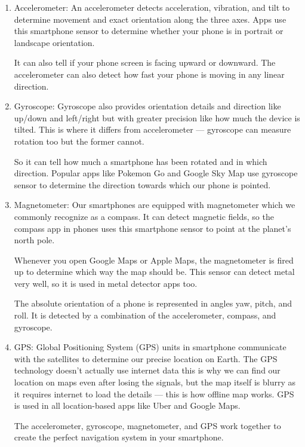 \documentclass[12pt]{article}
\begin{document}
\begin{enumerate}

\item Accelerometer: An accelerometer detects acceleration, vibration, and tilt to determine movement and exact orientation along the three axes. Apps use this smartphone sensor to determine whether your phone is in portrait or landscape orientation.

It can also tell if your phone screen is facing upward or downward. The accelerometer can also detect how fast your phone is moving in any linear direction.

\item Gyroscope: Gyroscope also provides orientation details and direction like up/down and left/right but with greater precision like how much the device is tilted. This is where it differs from accelerometer — gyroscope can measure rotation too but the former cannot.

So it can tell how much a smartphone has been rotated and in which direction. Popular apps like Pokemon Go and Google Sky Map use gyroscope sensor to determine the direction towards which our phone is pointed.

\item Magnetometer: Our smartphones are equipped with magnetometer which we commonly recognize as a compass. It can detect magnetic fields, so the compass app in phones uses this smartphone sensor to point at the planet’s north pole.

Whenever you open Google Maps or Apple Maps, the magnetometer is fired up to determine which way the map should be. This sensor can detect metal very well, so it is used in metal detector apps too.

    The absolute orientation of a phone is represented in angles yaw, pitch, and roll. It is detected by a combination of the accelerometer, compass, and gyroscope.

\item GPS: Global Positioning System (GPS) units in smartphone communicate with the satellites to determine our precise location on Earth. The GPS technology doesn’t actually use internet data this is why we can find our location on maps even after losing the signals, but the map itself is blurry as it requires internet to load the details — this is how offline map works. GPS is used in all location-based apps like Uber and Google Maps.

    The accelerometer, gyroscope, magnetometer, and GPS work together to create the perfect navigation system in your smartphone.


\end{enumerate}
\end{document}
